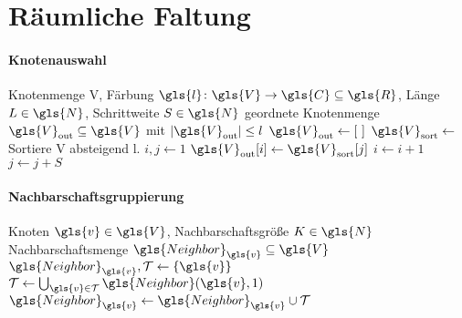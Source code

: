 \section{Räumliche Faltung}
\label{raeumliche_faltung}

\paragraph{Knotenauswahl}
\label{knotenauswahl}

\begin{algorithm}[t]
\centering
\begin{algorithmic}
  \REQUIRE{} Knotenmenge \gls{V}, Färbung $\gls{l} \colon \gls{V} \to \gls{C} \subseteq \gls{R}$, Länge $L \in \gls{N}$, Schrittweite $S \in \gls{N}$
  \ENSURE{} geordnete Knotenmenge $\gls{V}_{\mathrm{out}} \subseteq \gls{V}$ mit $\left|\gls{V}_{\mathrm{out}}\right| \leq l$
  \STATE{} $\gls{V}_\mathrm{out} \leftarrow \left[\,\,\right]$
  \STATE{} $\gls{V}_{\mathrm{sort}} \leftarrow$ Sortiere \gls{V} absteigend \bzgl{} \gls{l}.
  \STATE{} $i, j \leftarrow 1$
      \STATE{} $\gls{V}_{\mathrm{out}}\left[i\right] \leftarrow \gls{V}_{\mathrm{sort}}\left[j\right]$
    \ENDIF{}
    \STATE{} $i \leftarrow i + 1$
    \STATE{} $j \leftarrow j + S$
  \ENDWHILE{}
\end{algorithmic}
\caption[Knotenauswahl]{}
\label{alg:knotenauswahl}
\end{algorithm}

\paragraph{Nachbarschaftsgruppierung}
\label{nachbarschaftsgruppierung}

\begin{algorithm}[t]
\centering
\begin{algorithmic}
  \REQUIRE{} Knoten $\gls{v} \in \gls{V}$, Nachbarschaftsgröße $K \in \gls{N}$
  \ENSURE{} Nachbarschaftsmenge $\gls{Neighbor}_{\gls{v}} \subseteq \gls{V}$
  \STATE{} $\gls{Neighbor}_{\gls{v}}, \mathcal{T} \leftarrow \left\{\gls{v}\right\}$
    \STATE{} $\mathcal{T} \leftarrow \bigcup_{\gls{v} \in \mathcal{T}} \gls{Neighbor}\left(\gls{v}, 1\right)$
    \STATE{} $\gls{Neighbor}_{\gls{v}} \leftarrow \gls{Neighbor}_{\gls{v}} \cup \mathcal{T}$
  \ENDWHILE{}
\end{algorithmic}
\caption[Nachbarschaftsgruppierung]{}
\label{alg:knotenauswahl}
\end{algorithm}

